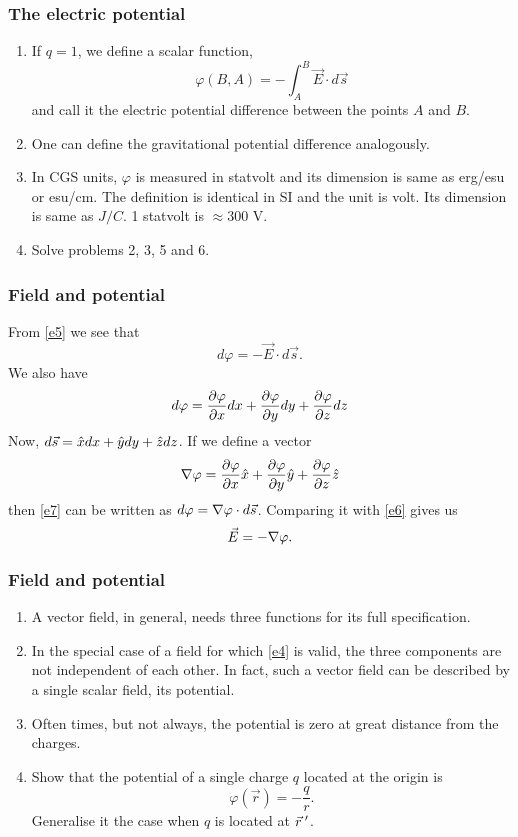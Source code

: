 \documentclass{beamer}
\begin{document}
\begin{frame}
\frametitle{The electric potential}
\begin{enumerate}
\item If $q = 1$, we define a scalar function,
\begin{equation}\label{e5}
\varphi(B, A) = -\int_A^B\vec{E}\cdot d\vec{s}
\end{equation}
and call it the electric potential difference between the points $A$ and $B$.
\item One can define the gravitational potential difference analogously.
\item In CGS units, $\varphi$ is measured in statvolt and its dimension is same
as erg/esu or esu/cm. The definition is identical in SI and the unit is volt.
Its dimension is same as $J/C$. 1 statvolt is $\approx 300$ V.
\item Solve problems 2, 3, 5 and 6.
\end{enumerate}
\end{frame}

\begin{frame}
\frametitle{Field and potential}
From \eqref{e5} we see that
\begin{equation}\label{e6}
d\varphi = -\vec{E}\cdot d\vec{s}.
\end{equation}
We also have
\begin{equation}\label{e7}
d\varphi = \frac{\partial{\varphi}}{\partial{x}}dx + \frac{\partial{\varphi}}{\partial{y}}dy + \frac{\partial{\varphi}}{\partial{z}}dz
\end{equation}
Now, $d\vec{s} = \hat{x}dx + \hat{y}dy + \hat{z}dz$. If we define a vector
\begin{equation}\label{e8}
\nabla\varphi = \frac{\partial{\varphi}}{\partial{x}}\hat{x} + \frac{\partial{\varphi}}{\partial{y}}\hat{y} + \frac{\partial{\varphi}}{\partial{z}}\hat{z}
\end{equation}
then \eqref{e7} can be written as $d\varphi = \nabla\varphi\cdot d\vec{s}$. Comparing
it with \eqref{e6} gives us
\begin{equation}\label{e9}
\vec{E} = -\nabla\varphi.
\end{equation}
\end{frame}

\begin{frame}
\frametitle{Field and potential}
\begin{enumerate}
\item A vector field, in general, needs three functions for its full specification.
\item In the special case of a field for which \eqref{e4} is valid, the three components
are not independent of each other. In fact, such a vector field can be described
by a single scalar field, its potential.
\item Often times, but not always, the potential is zero at great distance from the
charges.
\item Show that the potential of a single charge $q$ located at the origin is
\begin{equation}\label{e10}
\varphi(\vec{r}) = -\frac{q}{r}.
\end{equation}
Generalise it the case when $q$ is located at $\vec{r}^{\;\prime}$.
\end{enumerate}
\end{frame}
\end{document}
